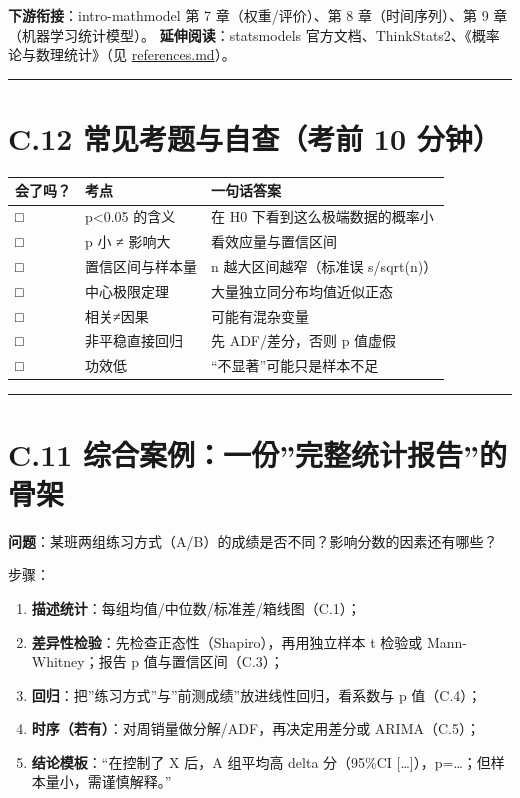 \textbf{下游衔接}：intro-mathmodel 第 7 章（权重/评价）、第 8
章（时间序列）、第 9 章（机器学习统计模型）。
\textbf{延伸阅读}：statsmodels
官方文档、ThinkStats2、《概率论与数理统计》（见
\href{./references.md}{references.md}）。

\begin{center}\rule{0.5\linewidth}{0.5pt}\end{center}

\section{C.12 常见考题与自查（考前 10
分钟）}\label{c.12-ux5e38ux89c1ux8003ux9898ux4e0eux81eaux67e5ux8003ux524d-10-ux5206ux949f}

{\def\LTcaptype{none} %
\begin{longtable}[]{@{}lll@{}}
\toprule\noalign{}
会了吗？ & 考点 & 一句话答案 \\
\midrule\noalign{}
\endhead
\bottomrule\noalign{}
\endlastfoot
□ & p\textless0.05 的含义 & 在 H0 下看到这么极端数据的概率小 \\
□ & p 小 ≠ 影响大 & 看效应量与置信区间 \\
□ & 置信区间与样本量 & n 越大区间越窄（标准误 s/sqrt(n)） \\
□ & 中心极限定理 & 大量独立同分布均值近似正态 \\
□ & 相关≠因果 & 可能有混杂变量 \\
□ & 非平稳直接回归 & 先 ADF/差分，否则 p 值虚假 \\
□ & 功效低 & ``不显著''可能只是样本不足 \\
\end{longtable}
}

\begin{center}\rule{0.5\linewidth}{0.5pt}\end{center}

\section{C.11
综合案例：一份''完整统计报告''的骨架}\label{c.11-ux7efcux5408ux6848ux4f8bux4e00ux4efdux5b8cux6574ux7edfux8ba1ux62a5ux544aux7684ux9aa8ux67b6}

\textbf{问题}：某班两组练习方式（A/B）的成绩是否不同？影响分数的因素还有哪些？

步骤：

\begin{enumerate}
\def\labelenumi{\arabic{enumi}.}
\tightlist
\item
  \textbf{描述统计}：每组均值/中位数/标准差/箱线图（C.1）；
\item
  \textbf{差异性检验}：先检查正态性（Shapiro），再用独立样本 t 检验或
  Mann-Whitney；报告 p 值与置信区间（C.3）；
\item
  \textbf{回归}：把''练习方式''与''前测成绩''放进线性回归，看系数与 p
  值（C.4）；
\item
  \textbf{时序（若有）}：对周销量做分解/ADF，再决定用差分或
  ARIMA（C.5）；
\item
  \textbf{结论模板}：``在控制了 X 后，A 组平均高 delta 分（95\%CI
  {[}\ldots{]}），p=\ldots；但样本量小，需谨慎解释。''
\end{enumerate}


